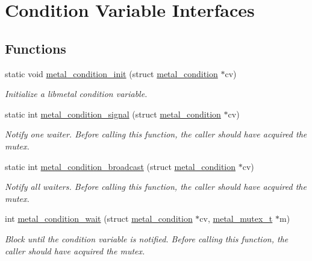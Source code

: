 \hypertarget{group__condition}{}\section{Condition Variable Interfaces}
\label{group__condition}
\subsection*{Functions}
\begin{DoxyCompactItemize}
\item 
static void \hyperlink{group__condition_ga879378a795dc41afc4025c083f203e4e}{metal\+\_\+condition\+\_\+init} (struct \hyperlink{structmetal__condition}{metal\+\_\+condition} $\ast$cv)
\begin{DoxyCompactList}\small\item\em Initialize a libmetal condition variable. \end{DoxyCompactList}\item 
static int \hyperlink{group__condition_ga042f4c19e3ddb3136365f4426e8bc439}{metal\+\_\+condition\+\_\+signal} (struct \hyperlink{structmetal__condition}{metal\+\_\+condition} $\ast$cv)
\begin{DoxyCompactList}\small\item\em Notify one waiter. Before calling this function, the caller should have acquired the mutex. \end{DoxyCompactList}\item 
static int \hyperlink{group__condition_ga80d63ed8a725e3a4a3291e58147fc4ae}{metal\+\_\+condition\+\_\+broadcast} (struct \hyperlink{structmetal__condition}{metal\+\_\+condition} $\ast$cv)
\begin{DoxyCompactList}\small\item\em Notify all waiters. Before calling this function, the caller should have acquired the mutex. \end{DoxyCompactList}\item 
int \hyperlink{group__condition_ga82b937a6692589f5a6025d823ac243c2}{metal\+\_\+condition\+\_\+wait} (struct \hyperlink{structmetal__condition}{metal\+\_\+condition} $\ast$cv, \hyperlink{structmetal__mutex__t}{metal\+\_\+mutex\+\_\+t} $\ast$m)
\begin{DoxyCompactList}\small\item\em Block until the condition variable is notified. Before calling this function, the caller should have acquired the mutex. \end{DoxyCompactList}\end{DoxyCompactItemize}


